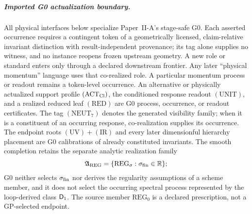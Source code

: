 \documentclass[12pt,a4paper]{article}
\begin{document}
\subparagraph{Imported G0 actualization boundary.}
All physical interfaces below specialize Paper~II-A's stage-safe G0.  Each
asserted occurrence requires a contingent token of a geometrically licensed,
claim-relative invariant distinction with result-independent provenance; its
tag alone supplies no witness, and no instance reopens frozen upstream
geometry.  A new role or standard enters only through a declared downstream
frontier.
Any later ``physical momentum'' language uses that co-realized role.  A
particular momentum process or readout remains a token-level occurrence.
An alternative or physically actualized support profile
\((\mathrm{ACT}_{\rm Cl})\), the conditioned response readout
\((\mathrm{UNIT})\), and a
realized reduced leaf \((\mathrm{RED})\) are G0 process, occurrence, or
readout certificates.  The tag \((\mathrm{NEUT}_7)\) denotes the generated
visibility family; when it is a constituent of an occurring response,
co-realization supplies its occurrence.  The endpoint roots
\((\mathrm{UV})+(\mathrm{IR})\) and every later dimensionful hierarchy placement are G0
calibrations of already constituted invariants.  The smooth completion retains the separate analytic realization family
\[
 \mathfrak A_{\rm REG}
 =\{\mathrm{REG}_{\sigma}:\sigma_{\rm fin}\in\mathbb R\};
\]
G0 neither selects \(\sigma_{\rm fin}\) nor derives the regularity assumptions
of a scheme member, and it does not select the occurring spectral process
represented by the loop-derived class \(\mathsf{D}_1\).  The source member
\(\mathrm{REG}_0\) is a declared prescription, not a GP-selected endpoint.
\end{document}
